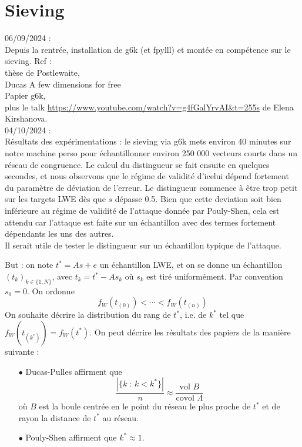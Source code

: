 \documentclass{article}
\begin{document}
\section{Sieving}
 
06/09/2024 : \\
Depuis la rentrée, installation de g6k (et fpylll) et montée en compétence sur le sieving. 
Ref : \\
thèse de Postlewaite, \\
Ducas A few dimensions for free\\
Papier g6k, \\
plus le talk \url{https://www.youtube.com/watch?v=g4fGalYrvAI&t=255s} de Elena Kirshanova.\\

04/10/2024 :\\
Résultats des expérimentations : le sieving via g6k mets environ 40 minutes sur notre machine perso pour échantillonner environ 250 000 vecteurs courts dans un réseau de congruence. Le calcul du distingueur se fait ensuite en quelques secondes, et nous observons que le régime de validité d'icelui dépend fortement du paramètre de déviation de l'erreur. Le distingueur commence à être trop petit sur les targets LWE dès que $s$ dépasse 0.5. Bien que cette deviation soit bien inférieure au régime de validité de l'attaque donnée par Pouly-Shen, cela est attendu car l'attaque est faite sur un échantillon avec des termes fortement dépendants les uns des autres.\\

Il serait utile de tester le distingueur sur un échantillon typique de l'attaque. 

But : on note $t^* = As+e$ un échantillon LWE, et on se donne un échantillon $(t_k)_{k\in\{1,N\}}$, avec $t_k = t^* - A s_k$ où $s_k$ est tiré uniformément. Par convention $s_0=0$. On ordonne 
\[ f_W(t_{(0)})<\cdots < f_W(t_{(n)}) \]
On souhaite décrire la distribution du rang de $t^*$, i.e. de $k^*$ tel que $f_W(t_{(k^*)}) = f_W(t^*)$.
On peut décrire les résultats des papiers de la manière suivante :
\begin{itemize}
\item[$\bullet$] Ducas-Pulles affirment que 
\[\frac{|\{k \ : \ k < k^* \}|}{n} \approx \frac{\text{vol }B}{\text{covol }\Lambda}\]
où $B$ est la boule centrée en le point du réseau le plus proche de $t^*$ et de rayon la distance de $t^*$ au réseau.
\item[$\bullet$] Pouly-Shen affirment que $k^*\approx 1$.
\end{itemize}
\end{document}
